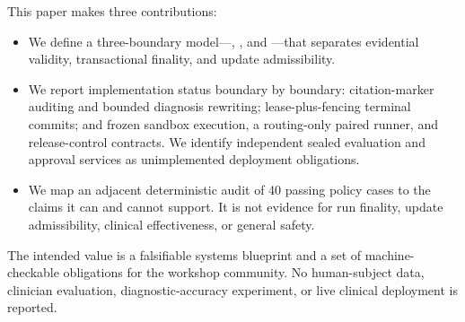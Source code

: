 This paper makes three contributions:
\begin{itemize}[leftmargin=*,nosep]
    \item We define a three-boundary model---\claimcheck,
    \runcommit, and \updategate---that separates evidential validity,
    transactional finality, and update admissibility.
    \item We report implementation status boundary by boundary: citation-marker
    auditing and bounded diagnosis rewriting; lease-plus-fencing terminal
    commits; and frozen sandbox execution, a routing-only paired runner, and
    release-control contracts.  We identify independent sealed evaluation and
    approval services as unimplemented deployment obligations.
    \item We map an adjacent deterministic audit of 40 passing policy cases to
    the claims it can and cannot support.  It is not evidence for run finality,
    update admissibility, clinical effectiveness, or general safety.
\end{itemize}

The intended value is a falsifiable systems blueprint and a set of
machine-checkable obligations for the workshop community.  No human-subject
data, clinician evaluation, diagnostic-accuracy experiment, or live clinical
deployment is reported.
